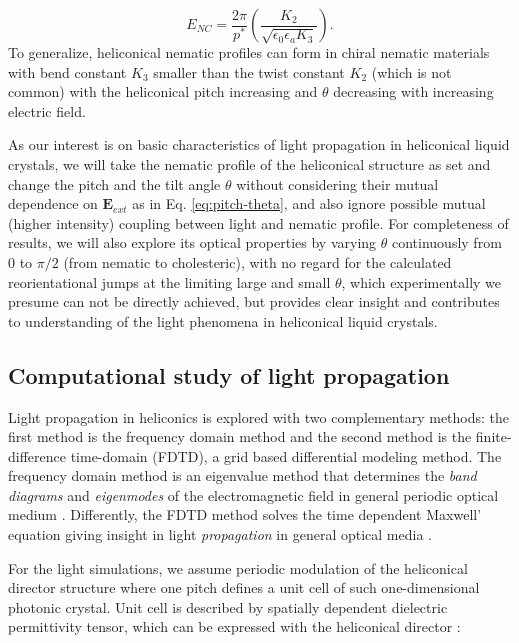 \documentclass{osa-article}
\renewcommand{\vec}[1]{\mathbf{#1}}
\begin{document}
\begin{equation}
  E_{NC} = \dfrac{2\pi}{p^{\ast}} \left( \dfrac{K_2}{\sqrt{\epsilon_0 \epsilon_a K_3}} \right).
\end{equation}
To generalize, heliconical nematic profiles can form in chiral nematic materials with bend constant $K_3$ smaller than the twist constant $K_2$ (which is not common) 
with the heliconical pitch increasing and $\theta$ decreasing with increasing electric field. 

As our interest is on basic characteristics of light propagation in heliconical liquid crystals, we will take the nematic profile of the heliconical structure as set 
and change the pitch and the tilt angle $\theta$ without considering their mutual dependence on $\vec{E}_{ext}$ as in Eq. \ref{eq:pitch-theta}, 
and also ignore possible mutual (higher intensity) coupling between light and nematic profile. 
For completeness of results, we will also explore its optical properties by varying $\theta$ continuously from $0$ to $\pi/2$ (from nematic to cholesteric), 
with no regard for the calculated reorientational jumps at the limiting large and small $\theta$, which experimentally we presume can not be directly achieved, 
but provides clear insight and contributes to understanding of the light phenomena in heliconical liquid crystals. 


\subsection{Computational study of light propagation}
Light propagation in heliconics is explored with two complementary methods: 
the first method is the frequency domain method and the second method is the finite-difference time-domain (FDTD), a grid based differential modeling method.
The frequency domain method is an eigenvalue method that determines the {\it band diagrams} and {\it eigenmodes} of the
electromagnetic field in general periodic optical medium \cite{book:joa}. Differently, the FDTD method solves the time dependent Maxwell' equation giving insight in light {\it propagation} in general optical media \cite{TafloveA_2000}. 

For the light simulations, we assume periodic modulation of the heliconical director structure
where one pitch defines a unit cell of such one-dimensional photonic crystal. 
Unit cell is described by spatially dependent dielectric
permittivity tensor, which can be expressed with the heliconical director \cite{KlemanM87}: 
\end{document}
